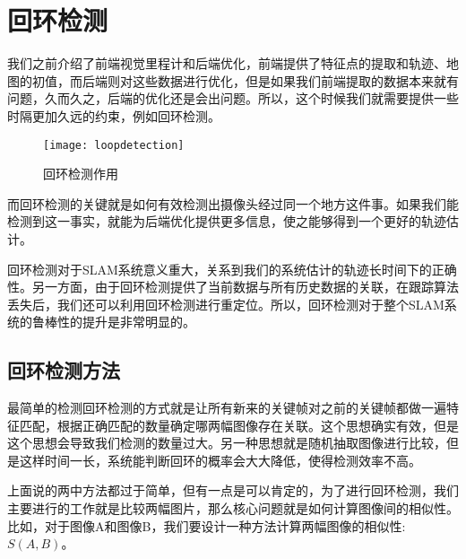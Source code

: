 \chapter{回环检测}
我们之前介绍了前端视觉里程计和后端优化，前端提供了特征点的提取和轨迹、地图的初值，而后端则对这些数据进行优化，但是如果我们前端提取的数据本来就有问题，久而久之，后端的优化还是会出问题。所以，这个时候我们就需要提供一些时隔更加久远的约束，例如回环检测。
\par
\begin{figure}[H]
	\centering
	\texttt{[image: loopdetection]}
	\caption{回环检测作用}
\end{figure}
而回环检测的关键就是如何有效检测出摄像头经过同一个地方这件事。如果我们能检测到这一事实，就能为后端优化提供更多信息，使之能够得到一个更好的轨迹估计。\par
回环检测对于SLAM系统意义重大，关系到我们的系统估计的轨迹长时间下的正确性。另一方面，由于回环检测提供了当前数据与所有历史数据的关联，在跟踪算法丢失后，我们还可以利用回环检测进行重定位。所以，回环检测对于整个SLAM系统的鲁棒性的提升是非常明显的。
\section{回环检测方法}
最简单的检测回环检测的方式就是让所有新来的关键帧对之前的关键帧都做一遍特征匹配，根据正确匹配的数量确定哪两幅图像存在关联。这个思想确实有效，但是这个思想会导致我们检测的数量过大。另一种思想就是随机抽取图像进行比较，但是这样时间一长，系统能判断回环的概率会大大降低，使得检测效率不高。\par
上面说的两中方法都过于简单，但有一点是可以肯定的，为了进行回环检测，我们主要进行的工作就是比较两幅图片，那么核心问题就是如何计算图像间的相似性。比如，对于图像A和图像B，我们要设计一种方法计算两幅图像的相似性:$S(A, B)$。
